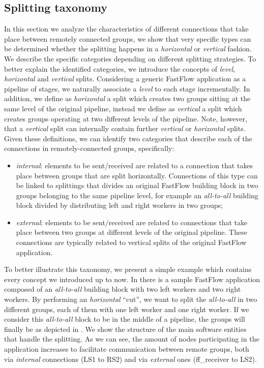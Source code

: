 \subsection{Splitting taxonomy}
In this section we analyze the characteristics of different connections that take place between remotely connected groups, we show that very specific types can be determined whether the splitting happens in a \textit{horizontal} or \textit{vertical} fashion. We describe the specific categories depending on different splitting strategies. To better explain the identified categories, we introduce the concepts of \textit{level}, \textit{horizontal} and \textit{vertical} splits. Considering a generic FastFlow application as a pipeline of stages, we naturally associate a \textit{level} to each stage incrementally. In addition, we define as \textit{horizontal} a split which creates two groups sitting at the same level of the original pipeline, instead we define as \textit{vertical} a split which creates groups operating at two different levels of the pipeline. Note, however, that a \textit{vertical} split can internally contain further \textit{vertical} or \textit{horizontal} splits. Given these definitions, we can identify two categories that describe each of the connections in remotely-connected groups, specifically:
\begin{itemize}
    \item \textit{internal}: elements to be sent/received are related to a connection that takes place between groups that are split horizontally. Connections of this type can be linked to splittings that divides an original FastFlow building block in two groups belonging to the same pipeline level, for example an \textit{all-to-all} building block divided by distributing left and right workers in two groups;
    \item \textit{external}: elements to be sent/received are related to connections that take place between two groups at different levels of the original pipeline. These connections are typically related to vertical splits of the original FastFlow application.
\end{itemize}

To better illustrate this taxonomy, we present a simple example which contains every concept we introduced up to now. In  there is a sample FastFlow application composed of an \textit{all-to-all} building block with two left workers and two right workers. By performing an \textit{horizontal} ``cut'', we want to split the \textit{all-to-all} in two different groups, each of them with one left worker and one right worker. If we consider this \textit{all-to-all} block to be in the middle of a pipeline, the groups will finally be as depicted in . We show the structure of the main software entities that handle the splitting. As we can see, the amount of nodes participating in the application increases to facilitate communication between remote groups, both via \textit{internal} connections (LS1 to RS2) and via \textit{external} ones (ff\_receiver to LS2).\newline

